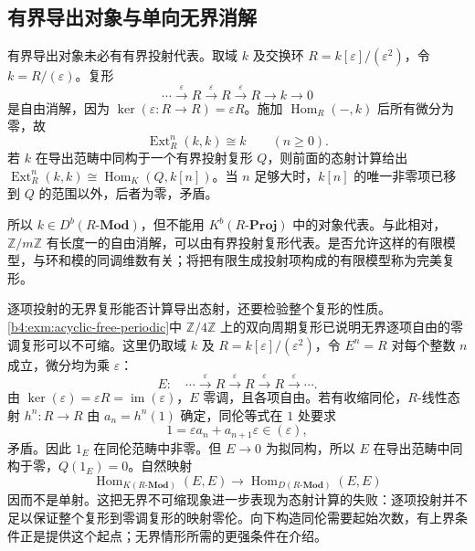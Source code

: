 \subsection{有界导出对象与单向无界消解}
\label{b4:subsec:1704:04}

有界导出对象未必有有界投射代表。取域 \(k\) 及交换环 \(R=k[\varepsilon]/(\varepsilon^2)\)，令 \(k=R/(\varepsilon)\)。复形
\[
	\cdots\xrightarrow{\varepsilon}R\xrightarrow{\varepsilon}R \xrightarrow{\varepsilon}R\longrightarrow k\longrightarrow0
\]
是自由消解，因为 \(\ker(\varepsilon:R\to R)=\varepsilon R\)。施加 \(\operatorname{Hom}_R(-,k)\) 后所有微分为零，故
\[
	\operatorname{Ext}_R^n(k,k)\cong k\qquad(n\ge0).
\]
若 \(k\) 在导出范畴中同构于一个有界投射复形 \(Q\)，则前面的态射计算给出 \(\operatorname{Ext}_R^n(k,k)\cong\operatorname{Hom}_K(Q,k[n])\)。当 \(n\) 足够大时，\(k[n]\) 的唯一非零项已移到 \(Q\) 的范围以外，后者为零，矛盾。

\ProseParagraphBreak
所以 \(k\in D^b(R\text{-}\mathbf{Mod})\)，但不能用 \(K^b(R\text{-}\mathbf{Proj})\) 中的对象代表。与此相对，\(\mathbb Z/m\mathbb Z\) 有长度一的自由消解，可以由有界投射复形代表。是否允许这样的有限模型，与环和模的同调维数有关；将把有限生成投射项构成的有限模型称为完美复形。

\ProseParagraphBreak
逐项投射的无界复形能否计算导出态射，还要检验整个复形的性质。\cref{b4:exm:acyclic-free-periodic}中 \(\mathbb Z/4\mathbb Z\) 上的双向周期复形已说明无界逐项自由的零调复形可以不可缩。这里仍取域 \(k\) 及 \(R=k[\varepsilon]/(\varepsilon^2)\)，令 \(E^n=R\) 对每个整数 \(n\) 成立，微分均为乘 \(\varepsilon\)：
\[
	E:\quad\cdots\xrightarrow{\varepsilon}R \xrightarrow{\varepsilon}R\xrightarrow{\varepsilon}R \xrightarrow{\varepsilon}\cdots.
\]
由 \(\ker(\varepsilon)=\varepsilon R=\operatorname{im}(\varepsilon)\)，\(E\) 零调，且各项自由。若有收缩同伦，\(R\)-线性态射 \(h^n:R\to R\) 由 \(a_n=h^n(1)\) 确定，同伦等式在 \(1\) 处要求
\[
	1=\varepsilon a_n+a_{n+1}\varepsilon\in(\varepsilon),
\]
矛盾。因此 \(1_E\) 在同伦范畴中非零。但 \(E\to0\) 为拟同构，所以 \(E\) 在导出范畴中同构于零，\(Q(1_E)=0\)。自然映射
\[
	\operatorname{Hom}_{K(R\text{-}\mathbf{Mod})}(E,E) \longrightarrow \operatorname{Hom}_{D(R\text{-}\mathbf{Mod})}(E,E)
\]
因而不是单射。这把无界不可缩现象进一步表现为态射计算的失败：逐项投射并不足以保证整个复形到零调复形的映射零伦。向下构造同伦需要起始次数，有上界条件正是提供这个起点；无界情形所需的更强条件在介绍。
